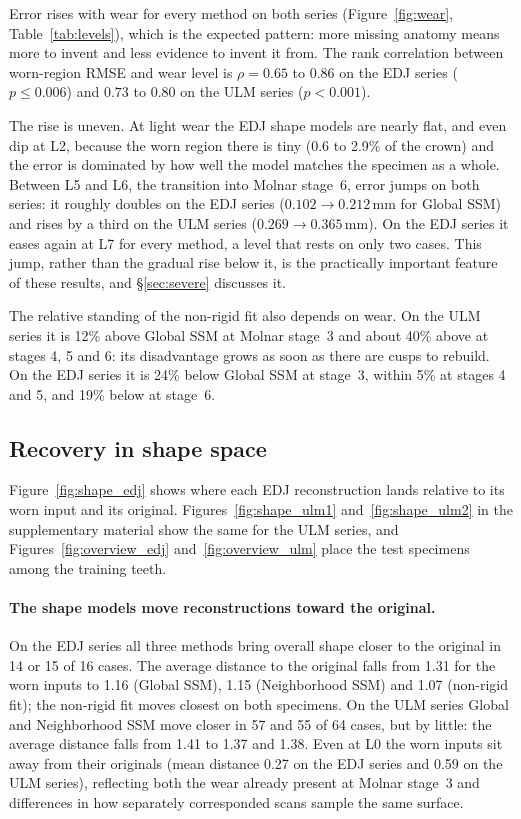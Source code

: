 \documentclass[10pt,a4paper,twocolumn]{article}
\newcommand{\mm}{\,\mathrm{mm}}
\begin{document}
Error rises with wear for every method on both series (Figure~\ref{fig:wear},
Table~\ref{tab:levels}), which is the expected pattern: more missing anatomy means
more to invent and less evidence to invent it from. The rank correlation between
worn-region RMSE and wear level is $\rho = 0.65$ to $0.86$ on the EDJ series
($p \le 0.006$) and $0.73$ to $0.80$ on the ULM series ($p<0.001$).

The rise is uneven. At light wear the EDJ shape models are nearly flat, and even
dip at L2, because the worn region there is tiny (0.6 to 2.9\% of the crown) and
the error is dominated by how well the model matches the specimen as a whole.
Between L5 and L6, the transition into Molnar stage~6, error jumps on both series:
it roughly doubles on the EDJ series ($0.102 \to 0.212\mm$ for Global SSM) and
rises by a third on the ULM series ($0.269 \to 0.365\mm$). On the EDJ series it
eases again at L7 for every method, a level that rests on only two cases. This jump, rather than
the gradual rise below it, is the practically important feature of these results,
and \S\ref{sec:severe} discusses it.

The relative standing of the non-rigid fit also depends on wear. On the ULM series
it is 12\% above Global SSM at Molnar stage~3 and about 40\% above at stages 4, 5
and 6: its disadvantage grows as soon as there are cusps to rebuild. On the EDJ
series it is 24\% below Global SSM at stage~3, within 5\% at stages 4 and 5, and
19\% below at stage~6.

\subsection{Recovery in shape space}
\label{sec:shaperesults}

Figure~\ref{fig:shape_edj} shows where each EDJ reconstruction lands relative to
its worn input and its original. Figures~\ref{fig:shape_ulm1}
and~\ref{fig:shape_ulm2} in the supplementary material show the same for the ULM
series, and Figures~\ref{fig:overview_edj} and~\ref{fig:overview_ulm} place the
test specimens among the training teeth.

\paragraph{The shape models move reconstructions toward the original.}
On the EDJ series all three methods bring overall shape closer to the original in
14 or 15 of 16 cases. The average distance to the original falls from 1.31 for the
worn inputs to 1.16 (Global SSM), 1.15 (Neighborhood SSM) and 1.07 (non-rigid
fit); the non-rigid fit moves closest on both specimens. On the ULM series Global
and Neighborhood SSM move closer in 57 and 55 of 64 cases, but by little: the
average distance falls from 1.41 to 1.37 and 1.38. Even at L0 the worn inputs sit
away from their originals (mean distance 0.27 on the EDJ series and 0.59 on the
ULM series), reflecting both the wear already present at Molnar stage~3 and
differences in how separately corresponded scans sample the same surface.
\end{document}

